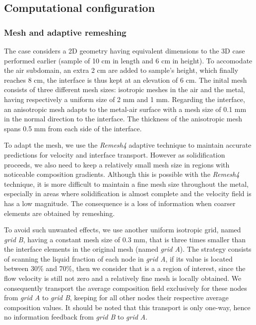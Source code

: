 \subsection{Computational configuration}


\subsubsection{Mesh and adaptive remeshing}
The case considers a 2D geometry having equivalent dimensions to the 3D case performed earlier (sample of 10 cm in length and 6 cm in height).
To accomodate the air subdomain, an extra 2 cm are added to sample's height, which finally reaches 8 cm, the interface is thus kept at an elevation of 6 cm. 
The inital mesh consists of three different mesh sizes: isotropic meshes in the air and the metal, having respectively a uniform size of 2 mm and 1 mm.
Regarding the interface, an anisotropic mesh adapts to the metal-air surface with a mesh size of 0.1 mm in the normal direction to the interface.
The thickness of the anisotropic mesh spans 0.5 mm from each side of the interface.

To adapt the mesh, we use the \emph{Remesh4} adaptive technique to maintain accurate predictions for velocity and interface transport.
However as solidification proceeds, we also need to keep a relatively small mesh size in regions with noticeable composition gradients.
Although this is possible with the \emph{Remesh4} technique, it is more difficult to maintain a fine mesh size throughout the metal, especially in areas
where solidification is almost complete and the velocity field is has a low magnitude. The consequence is a loss of information when coarser 
elements are obtained by remeshing.

To avoid such unwanted effects, we use another uniform
isotropic grid, named \emph{grid B}, having a constant mesh size of 0.3 mm, that is three times smaller than the interface elements in the original mesh (named \emph{grid A}).
The strategy consists of scanning the liquid fraction of each node in \emph{grid A}, if its value is located between 30\% and 70\%, then we consider that is a 
a region of interest, since the flow velocity is still not zero and a relatively fine mesh is locally obtained. 
We consequently transport the average composition field exclusively 
for these nodes from \emph{grid A} to \emph{grid B}, keeping for all other nodes their respective average composition values.
It should be noted that this transport is only one-way, hence no information feedback from \emph{grid B} to \emph{grid A}.


